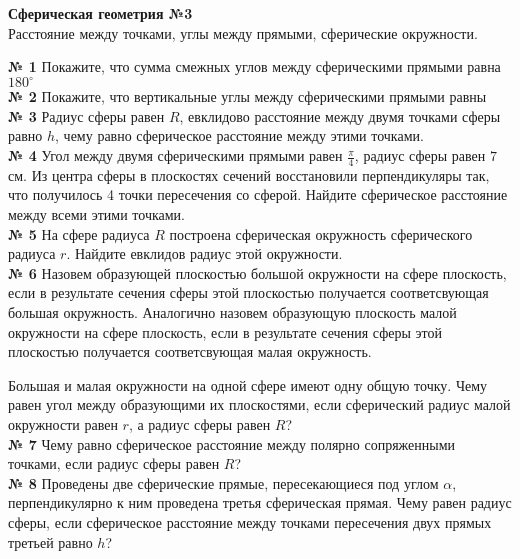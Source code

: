 


    \begin{center}
        \textbf{Сферическая геометрия №3}\\
        Расстояние между точками, углы между прямыми, сферические окружности.
    \end{center}

    \textbf{№ 1}
    Покажите, что сумма смежных углов между сферическими прямыми равна $180^\circ$\\


    \textbf{№ 2}
    Покажите, что вертикальные углы между сферическими прямыми равны\\


    \textbf{№ 3}
    Радиус сферы равен $R$, евклидово расстояние между двумя точками сферы равно $h$,
    чему равно сферическое расстояние между этими точками.\\


    \textbf{№ 4}
    Угол между двумя сферическими прямыми равен $\frac{\pi}{4}$, радиус сферы равен $7$ см.
    Из центра сферы в плоскостях сечений восстановили перпендикуляры так, что получилось 4 точки пересечения со сферой.
    Найдите сферическое расстояние между всеми этими точками.\\


    \textbf{№ 5}
    На сфере радиуса $R$ построена сферическая окружность сферического радиуса $r$.
    Найдите евклидов радиус этой окружности.\\


    \textbf{№ 6}
    Назовем образующей плоскостью большой окружности на сфере плоскость,
    если в результате сечения сферы этой плоскостью получается соответсвующая большая окружность.
    Аналогично назовем образующую плоскость малой окружности на сфере плоскость,
    если в результате сечения сферы этой плоскостью получается соответсвующая малая окружность.

    Большая и малая окружности на одной сфере имеют одну общую точку.
    Чему равен угол между образующими их плоскостями, если сферический радиус малой окружности равен $r$,
    а радиус сферы равен $R$?\\


    \textbf{№ 7}
    Чему равно сферическое расстояние между полярно сопряженными точками, если радиус сферы равен $R$?\\


    \textbf{№ 8}
    Проведены две сферические прямые, пересекающиеся под углом $\alpha$,
    перпендикулярно к ним проведена третья сферическая прямая.
    Чему равен радиус сферы, если сферическое расстояние между точками пересечения
    двух прямых третьей равно $h$?\\


